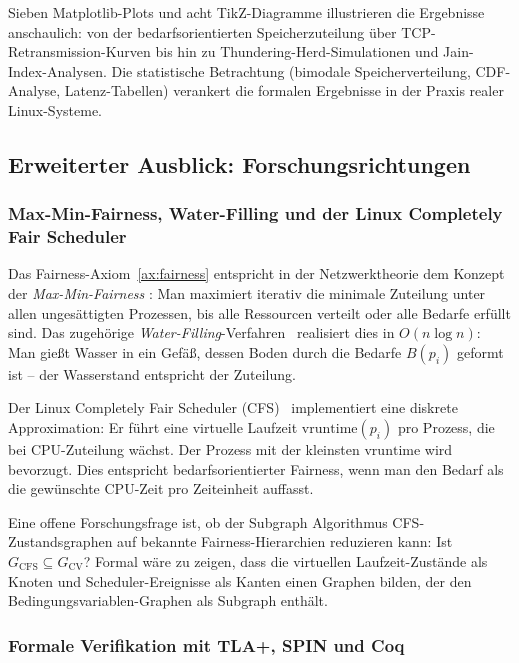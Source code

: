 ﻿\documentclass[a4paper,12pt]{article}
\theoremstyle{definition}
\begin{document}
Sieben Matplotlib-Plots und acht TikZ-Diagramme illustrieren
die Ergebnisse anschaulich: von der bedarfsorientierten
Speicherzuteilung über TCP-Retransmission-Kurven bis hin
zu Thundering-Herd-Simulationen und Jain-Index-Analysen.
Die statistische Betrachtung (bimodale Speicherverteilung,
CDF-Analyse, Latenz-Tabellen) verankert die formalen
Ergebnisse in der Praxis realer Linux-Systeme.

\subsection{Erweiterter Ausblick: Forschungsrichtungen}

\subsubsection{Max-Min-Fairness, Water-Filling und der
Linux Completely Fair Scheduler}

Das Fairness-Axiom~\ref{ax:fairness} entspricht in der
Netzwerktheorie dem Konzept der \emph{Max-Min-Fairness}
\cite{bertsekas1992data}: Man maximiert iterativ die minimale
Zuteilung unter allen ungesättigten Prozessen, bis alle
Ressourcen verteilt oder alle Bedarfe erfüllt sind.
Das zugehörige \emph{Water-Filling}-Verfahren~\cite{cover2006elements}
realisiert dies in $O(n \log n)$: Man gießt Wasser in ein
Gefäß, dessen Boden durch die Bedarfe $B(p_i)$ geformt ist --
der Wasserstand entspricht der Zuteilung.

Der Linux Completely Fair Scheduler (CFS)~\cite{molnar2007cfs}
implementiert eine diskrete Approximation: Er führt eine
virtuelle Laufzeit $\mathrm{vruntime}(p_i)$ pro Prozess,
die bei CPU-Zuteilung wächst. Der Prozess mit der kleinsten
$\mathrm{vruntime}$ wird bevorzugt. Dies entspricht
bedarfsorientierter Fairness, wenn man den Bedarf als
die gewünschte CPU-Zeit pro Zeiteinheit auffasst.

Eine offene Forschungsfrage ist, ob der Subgraph Algorithmus
CFS-Zustandsgraphen auf bekannte Fairness-Hierarchien
reduzieren kann: Ist $G_{\mathrm{CFS}} \subseteq G_{\mathrm{CV}}$?
Formal wäre zu zeigen, dass die virtuellen Laufzeit-Zustände
als Knoten und Scheduler-Ereignisse als Kanten einen Graphen
bilden, der den Bedingungsvariablen-Graphen als Subgraph enthält.

\subsubsection{Formale Verifikation mit TLA+, SPIN und Coq}
\end{document}
